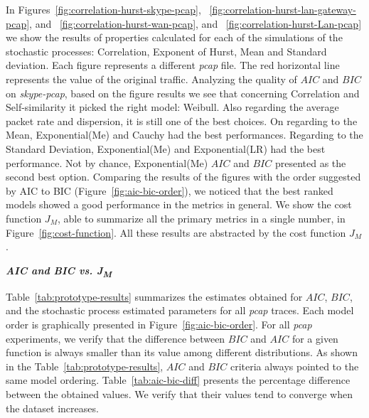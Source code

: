 In Figures~\ref{fig:correlation-hurst-skype-pcap}, ~\ref{fig:correlation-hurst-lan-gateway-pcap}, and ~\ref{fig:correlation-hurst-wan-pcap}, and  ~\ref{fig:correlation-hurst-Lan-pcap} we show the results of properties calculated for each of the simulations of the stochastic processes: Correlation, Exponent of Hurst, Mean and Standard deviation. Each figure represents a different \textit{pcap} file. The red horizontal line represents the value of the original traffic. Analyzing the quality of $AIC$ and $BIC$ on \textit{skype-pcap}, based on the figure results we see that concerning Correlation and Self-similarity it picked the right model: Weibull. Also regarding the average packet rate and dispersion, it is still one of the best choices. On regarding to the Mean, Exponential(Me) and Cauchy had the best performances. Regarding to the Standard Deviation, Exponential(Me) and Exponential(LR) had the best performance. Not by chance, Exponential(Me) $AIC$ and $BIC$ presented as the second best option. Comparing the results of the figures with the order suggested by AIC to BIC (Figure~\ref{fig:aic-bic-order}), we noticed that the best ranked models showed a good performance in the metrics in general. We show the cost function $J_M$, able to summarize all the primary metrics in a single number, in Figure~\ref{fig:cost-function}. All these results are abstracted by the cost function $J_M$. 


\smallskip \noindent  \textbf{\textit{AIC and BIC vs. J\textsubscript{M} }} 

Table~\ref{tab:prototype-results} summarizes the estimates obtained  for $AIC$, $BIC$, and the stochastic process estimated parameters for all \textit{pcap} traces. Each model order is graphically presented in Figure~\ref{fig:aic-bic-order}.  For all \textit{pcap} experiments, we verify that the difference between $BIC$ and $AIC$ for a given function is always smaller than its value among different distributions. As shown in the Table~\ref{tab:prototype-results}, $AIC$ and $BIC$ criteria always pointed to the same model ordering. Table~\ref{tab:aic-bic-diff} presents the percentage difference between the obtained values. We verify that their values tend to converge when the dataset increases. 

